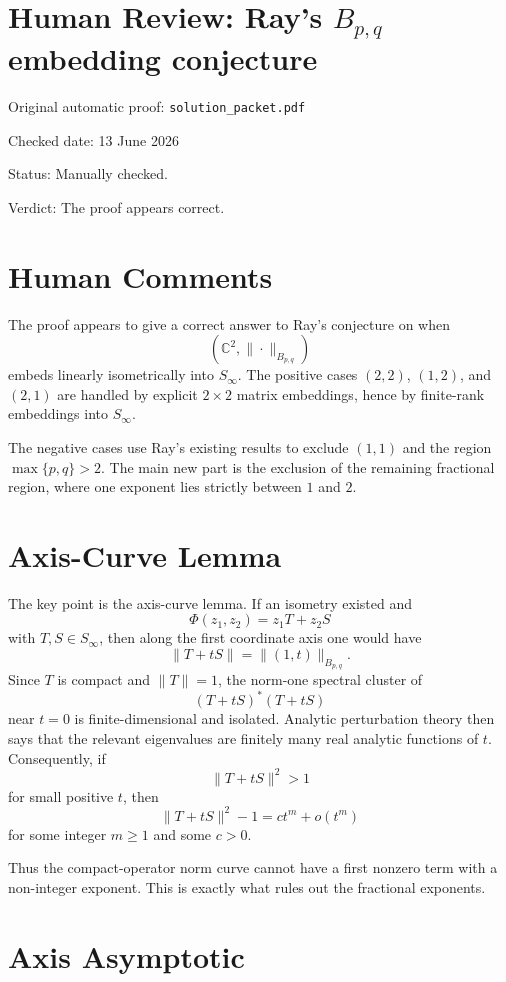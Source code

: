 \documentclass[11pt]{article}
\newcommand{\C}{\mathbb C}
\newcommand{\Sinf}{S_\infty}
\begin{document}
\section*{Human Review: Ray's \texorpdfstring{$B_{p,q}$}{Bpq} embedding conjecture}

\noindent Original automatic proof: \texttt{solution\_packet.pdf}

\noindent Checked date: 13 June 2026

\noindent Status: Manually checked.

\noindent Verdict: The proof appears correct.

\section*{Human Comments}

The proof appears to give a correct answer to Ray's conjecture on when
\[
  (\C^2,\|\cdot\|_{B_{p,q}})
\]
embeds linearly isometrically into \(\Sinf\). The positive cases
\((2,2)\), \((1,2)\), and \((2,1)\) are handled by explicit \(2\times2\)
matrix embeddings, hence by finite-rank embeddings into \(\Sinf\).

The negative cases use Ray's existing results to exclude \((1,1)\) and the
region \(\max\{p,q\}>2\). The main new part is the exclusion of the remaining
fractional region, where one exponent lies strictly between \(1\) and \(2\).

\section*{Axis-Curve Lemma}

The key point is the axis-curve lemma. If an isometry existed and
\[
  \Phi(z_1,z_2)=z_1T+z_2S
\]
with \(T,S\in \Sinf\), then along the first coordinate axis one would have
\[
  \|T+tS\|=\|(1,t)\|_{B_{p,q}}.
\]
Since \(T\) is compact and \(\|T\|=1\), the norm-one spectral cluster of
\[
  (T+tS)^*(T+tS)
\]
near \(t=0\) is finite-dimensional and isolated. Analytic perturbation theory
then says that the relevant eigenvalues are finitely many real analytic
functions of \(t\). Consequently, if
\[
  \|T+tS\|^2>1
\]
for small positive \(t\), then
\[
  \|T+tS\|^2-1=ct^m+o(t^m)
\]
for some integer \(m\ge1\) and some \(c>0\).

Thus the compact-operator norm curve cannot have a first nonzero term with a
non-integer exponent. This is exactly what rules out the fractional exponents.

\section*{Axis Asymptotic}
\end{document}
